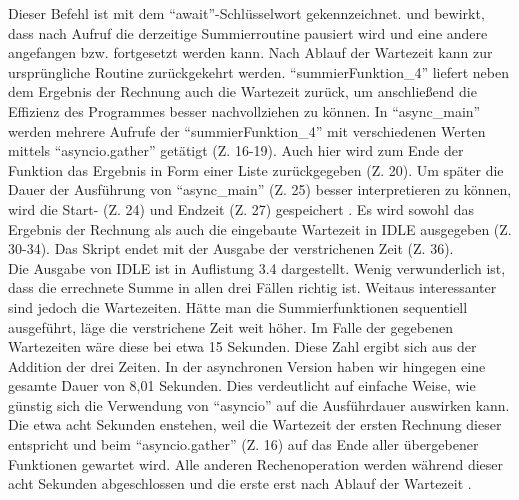 Dieser Befehl ist mit dem ``await''-Schlüsselwort gekennzeichnet. und bewirkt, dass nach Aufruf die derzeitige Summierroutine pausiert wird und eine andere angefangen bzw. fortgesetzt werden kann. 
Nach Ablauf der Wartezeit kann zur ursprüngliche Routine zurückgekehrt werden. ``summierFunktion\_4'' liefert neben dem Ergebnis der Rechnung auch die Wartezeit zurück, um anschließend die Effizienz des Programmes besser nachvollziehen zu können.
In ``async\_main'' werden mehrere Aufrufe der ``summierFunktion\_4'' mit verschiedenen Werten mittels ``asyncio.gather'' getätigt (Z. 16-19). Auch hier wird zum Ende der Funktion das Ergebnis in Form einer Liste zurückgegeben (Z. 20). Um später die Dauer der Ausführung von ``async\_main'' (Z. 25) besser interpretieren zu können, wird die Start- (Z. 24) und Endzeit (Z. 27) gespeichert \cite{PythonSoftwareFoundation.c}. Es wird sowohl das Ergebnis der Rechnung als auch die eingebaute Wartezeit in IDLE ausgegeben (Z. 30-34). Das Skript endet mit der Ausgabe der verstrichenen Zeit (Z. 36).
\\Die Ausgabe von IDLE ist in Auflistung 3.4 dargestellt. Wenig verwunderlich ist, dass die errechnete Summe in allen drei Fällen richtig ist. Weitaus interessanter sind jedoch die Wartezeiten. Hätte man die Summierfunktionen sequentiell ausgeführt, läge die verstrichene Zeit weit höher. Im Falle der gegebenen Wartezeiten wäre diese bei etwa 15 Sekunden. Diese Zahl ergibt sich aus der Addition der drei Zeiten. In der asynchronen Version haben wir hingegen eine gesamte Dauer von 8,01 Sekunden. Dies verdeutlicht auf einfache Weise, wie günstig sich die Verwendung von ``asyncio'' auf die Ausführdauer auswirken kann. Die etwa acht Sekunden enstehen, weil die Wartezeit der ersten Rechnung dieser entspricht und beim ``asyncio.gather'' (Z. 16) auf das Ende aller übergebener Funktionen gewartet wird. Alle anderen Rechenoperation werden während dieser acht Sekunden abgeschlossen und die erste erst nach Ablauf der Wartezeit \cite{PythonSoftwareFoundation.b}. 